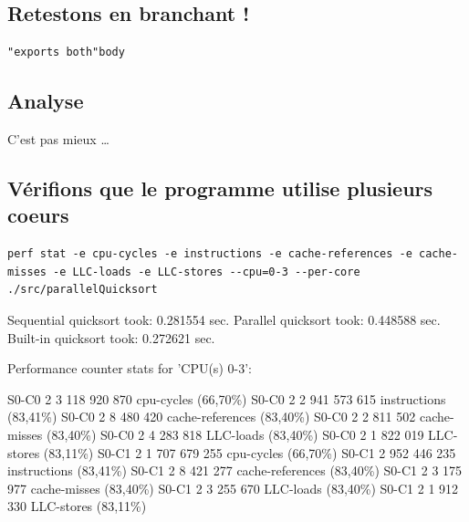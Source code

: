 \documentclass[11pt]{article}
\begin{document}
\subsection{Retestons en branchant !}
\label{sec:orgheadline7}

\begin{verbatim}
"exports both"body
\end{verbatim}

\subsection{Analyse}
\label{sec:orgheadline8}
C'est pas mieux \ldots{}

\subsection{Vérifions que le programme utilise plusieurs coeurs}
\label{sec:orgheadline9}

\begin{verbatim}
perf stat -e cpu-cycles -e instructions -e cache-references -e cache-misses -e LLC-loads -e LLC-stores --cpu=0-3 --per-core ./src/parallelQuicksort
\end{verbatim}

Sequential quicksort took: 0.281554 sec.
Parallel quicksort took: 0.448588 sec.
Built-in quicksort took: 0.272621 sec.

Performance counter stats for 'CPU(s) 0-3':

S0-C0           2      3 118 920 870      cpu-cycles                                                    (66,70\%)
S0-C0           2      2 941 573 615      instructions                                                  (83,41\%)
S0-C0           2          8 480 420      cache-references                                              (83,40\%)
S0-C0           2          2 811 502      cache-misses                                                  (83,40\%)
S0-C0           2          4 283 818      LLC-loads                                                     (83,40\%)
S0-C0           2          1 822 019      LLC-stores                                                    (83,11\%)
S0-C1           2      1 707 679 255      cpu-cycles                                                    (66,70\%)
S0-C1           2        952 446 235      instructions                                                  (83,41\%)
S0-C1           2          8 421 277      cache-references                                              (83,40\%)
S0-C1           2          3 175 977      cache-misses                                                  (83,40\%)
S0-C1           2          3 255 670      LLC-loads                                                     (83,40\%)
S0-C1           2          1 912 330      LLC-stores                                                    (83,11\%)
\end{document}
